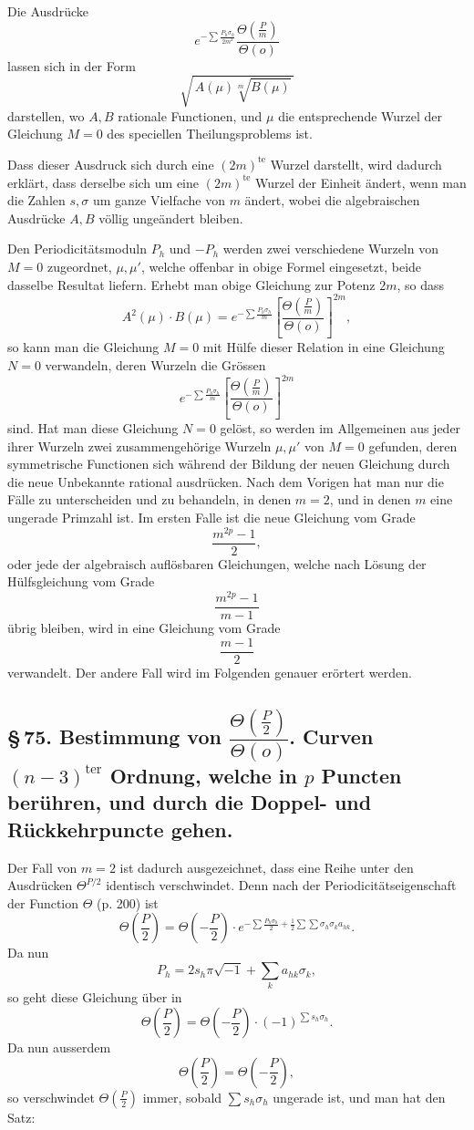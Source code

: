 \documentclass[10pt]{article}
\begin{document}
Die Ausdrücke
\[
e^{-\sum\frac{P_h\sigma_h}{2m^2}}
\frac{\Theta\left(\frac Pm\right)}{\Theta(o)}
\]
lassen sich in der Form
\[
\sqrt{\,A(\mu)\sqrt[m]{B(\mu)}\,}
\]
darstellen, wo \(A,B\) rationale Functionen, und \(\mu\) die entsprechende Wurzel der Gleichung \(M=0\) des speciellen Theilungsproblems ist.

Dass dieser Ausdruck sich durch eine \((2m)^{\text{te}}\) Wurzel darstellt, wird dadurch erklärt, dass derselbe sich um eine \((2m)^{\text{te}}\) Wurzel der Einheit ändert, wenn man die Zahlen \(s,\sigma\) um ganze Vielfache von \(m\) ändert, wobei die algebraischen Ausdrücke \(A,B\) völlig ungeändert bleiben.

Den Periodicitätsmoduln \(P_h\) und \(-P_h\) werden zwei verschiedene Wurzeln von \(M=0\) zugeordnet, \(\mu,\mu'\), welche offenbar in obige Formel eingesetzt, beide dasselbe Resultat liefern. Erhebt man obige Gleichung zur Potenz \(2m\), so dass
\[
A^2(\mu)\cdot B(\mu)
=
e^{-\sum\frac{P_h\sigma_h}{m}}
\left[\frac{\Theta\left(\frac Pm\right)}{\Theta(o)}\right]^{2m},
\]
so kann man die Gleichung \(M=0\) mit Hülfe dieser Relation in eine Gleichung \(N=0\) verwandeln, deren Wurzeln die Grössen
\[
e^{-\sum\frac{P_h\sigma_h}{m}}
\left[\frac{\Theta\left(\frac Pm\right)}{\Theta(o)}\right]^{2m}
\]
sind. Hat man diese Gleichung \(N=0\) gelöst, so werden im Allgemeinen aus jeder ihrer Wurzeln zwei zusammengehörige Wurzeln \(\mu,\mu'\) von \(M=0\) gefunden, deren symmetrische Functionen sich während der Bildung der neuen Gleichung durch die neue Unbekannte rational ausdrücken. Nach dem Vorigen hat man nur die Fälle zu unterscheiden und zu behandeln, in denen \(m=2\), und in denen \(m\) eine ungerade Primzahl ist. Im ersten Falle ist die neue Gleichung vom Grade
\[
\frac{m^{2p}-1}{2},
\]
oder jede der algebraisch auflösbaren Gleichungen, welche nach Lösung der Hülfs\-gleichung vom Grade
\[
\frac{m^{2p}-1}{m-1}
\]
übrig bleiben, wird in eine Gleichung vom Grade
\[
\frac{m-1}{2}
\]
verwandelt. Der andere Fall wird im Folgenden genauer erörtert werden.

\subsection*{\S\,75. Bestimmung von \(\dfrac{\Theta\left(\frac P2\right)}{\Theta(o)}\). Curven \((n-3)^{\text{ter}}\) Ordnung, welche in \(p\) Puncten berühren, und durch die Doppel- und Rückkehrpuncte gehen.}

Der Fall von \(m=2\) ist dadurch ausgezeichnet, dass eine Reihe unter den Ausdrücken \(\Theta^{P/2}\) identisch verschwindet. Denn nach der Periodicitätseigenschaft der Function \(\Theta\) (p. 200) ist
\[
\Theta\left(\frac P2\right)
=
\Theta\left(-\frac P2\right)\cdot
e^{-\sum\frac{P_h\sigma_h}{2}+\frac12\sum\sum\sigma_h\sigma_k a_{hk}}.
\]
Da nun
\[
P_h=2s_h\pi\sqrt{-1}+\sum_k a_{hk}\sigma_k,
\]
so geht diese Gleichung über in
\[
\Theta\left(\frac P2\right)=
\Theta\left(-\frac P2\right)\cdot(-1)^{\sum s_h\sigma_h}.
\]
Da nun ausserdem
\[
\Theta\left(\frac P2\right)=\Theta\left(-\frac P2\right),
\]
so verschwindet \(\Theta\left(\frac P2\right)\) immer, sobald \(\sum s_h\sigma_h\) ungerade ist, und man hat den Satz:
\end{document}
